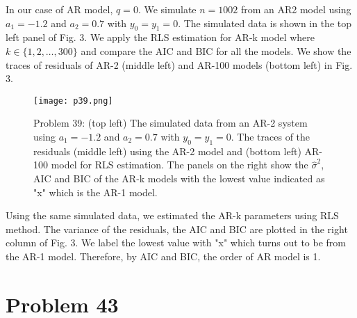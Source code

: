 \documentclass[a4paper, 11pt]{article}
\begin{document}
In our case of AR model, $q = 0$. We simulate $n = 1002$ from an AR2 model using $a_1 = -1.2$ and $a_2=0.7$ with $y_0 = y_1 = 0$. The simulated data is shown in the top left panel of Fig. 3. We apply the RLS estimation for AR-k model where $k \in \{1,2,\dots, 300 \}$ and compare the AIC and BIC for all the models. We show the traces of residuals of AR-2 (middle left) and AR-100 models (bottom left) in Fig. 3.  

\begin{figure}
	\begin{center}
		\texttt{[image: p39.png]}
		\caption{Problem 39: (top left) The simulated data from an AR-2 system using $a_1 = -1.2$ and $a_2=0.7$ with $y_0 = y_1 = 0$. The traces of the residuals (middle left) using the AR-2 model and (bottom left) AR-100 model for RLS estimation. The panels on the right show the $\hat{\sigma}^2$, AIC and BIC of the AR-k models with the lowest value indicated as "x" which is the AR-1 model. }
	\end{center}
\end{figure}

Using the same simulated data, we estimated the AR-k parameters using RLS method. The variance of the residuals, the AIC and BIC are plotted in the right column of Fig. 3. We label the lowest value with "x" which turns out to be from the AR-1 model. Therefore, by AIC and BIC, the order of AR model is 1. 



\section*{Problem 43}
\end{document}
